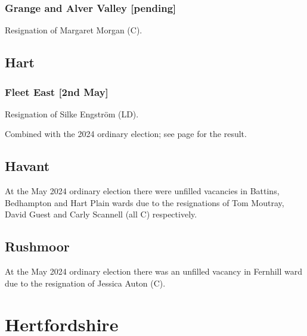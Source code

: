 \documentclass[a4paper,openany]{book}
\begin{document}
\begin{resultsiii}
\subsubsection*{Grange and Alver Valley \hspace*{\fill}\nolinebreak[1]%
	\enspace\hspace*{\fill}
	[pending]}


Resignation of Margaret Morgan (C).

\subsection*{Hart}

\subsubsection*{Fleet East \hspace*{\fill}\nolinebreak[1]%
	\enspace\hspace*{\fill}
	[2nd May]}


Resignation of Silke Engström (LD).

Combined with the 2024 ordinary election; see page \pageref{HartFleetEast} for the result.

\subsection*{Havant}

At the May 2024 ordinary election there were unfilled vacancies in Battins, Bedhampton and Hart Plain wards due to the resignations of Tom Moutray, David Guest and Carly Scannell (all C) respectively.%

\subsection*{Rushmoor}

At the May 2024 ordinary election there was an unfilled vacancy in Fernhill ward due to the resignation of Jessica Auton (C).%

\section{Hertfordshire}


\end{resultsiii}
\end{document}
